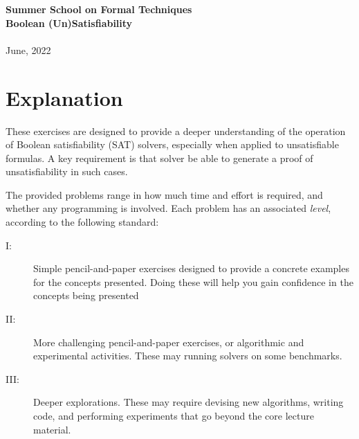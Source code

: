 
\usepackage[pdftex]{graphicx}


\usepackage{exercise}
\usepackage{enumitem}
\usepackage{color}
\usepackage{booktabs}
\usepackage{tikz}
\usepackage{bm}

\usepackage{hyperref}
\newcommand{\cref}[2]{\href{#1}{\color{blue}#2}}
\newcommand{\hcref}[1]{\cref{#1}{\small\tt #1}}


\newcommand{\proofhu}[1]{${\it HU}(\texttt{#1})$}
\newcommand{\prooflu}[1]{${\it LU}(\texttt{#1})$}
\newcommand{\proofhd}[1]{${\it HD}(\texttt{#1})$}
\newcommand{\proofld}[1]{${\it LD}(\texttt{#1})$}


\begin{center}
{\LARGE\bf Summer School on Formal Techniques\\ [1.5 ex]
Boolean (Un)Satisfiability \\[2ex]
}\\ [2 ex]
June, 2022
\end{center}
\section*{Explanation}

These exercises are designed to provide a deeper understanding of the
operation of Boolean satisfiability (SAT) solvers, especially when
applied to unsatisfiable formulas.  A key requirement is that solver
be able to generate a proof of unsatisfiability in such cases.

The provided problems range in how much time and effort is required,
and whether any programming is involved.  Each problem has an
associated {\em level}, according to the following standard:
\begin{description}
\item[I:] Simple pencil-and-paper exercises designed to provide a
  concrete examples for the concepts presented.  Doing these will
  help you gain confidence in the concepts being presented
\item[II:] More challenging pencil-and-paper exercises, or algorithmic
  and experimental activities.  These may running solvers on some
  benchmarks.
\item[III:] Deeper explorations.  These may require devising new
  algorithms, writing code, and performing experiments that go beyond
  the core lecture material.
\end{description}



